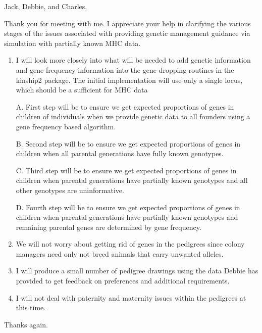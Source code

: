 \documentclass[
]{article}
\begin{document}
Jack, Debbie, and Charles,

Thank you for meeting with me. I appreciate your help in clarifying the
various stages of the issues associated with providing genetic
management guidance via simulation with partially known MHC data.

\begin{enumerate}
\def\labelenumi{\arabic{enumi}.}
\item
  I will look more closely into what will be needed to add genetic
  information and gene frequency information into the gene dropping
  routines in the kinship2 package. The initial implementation will use
  only a single locus, which should be a sufficient for MHC data

  A. First step will be to ensure we get expected proportions of genes
  in children of individuals when we provide genetic data to all
  founders using a gene frequency based algorithm.

  B. Second step will be to ensure we get expected proportions of genes
  in children when all parental generations have fully known genotypes.

  C. Third step will be to ensure we get expected proportions of genes
  in children when parental generations have partially known genotypes
  and all other genotypes are uninformative.

  D. Fourth step will be to ensure we get expected proportions of genes
  in children when parental generations have partially known genotypes
  and remaining parental genes are determined by gene frequency.
\item
  We will not worry about getting rid of genes in the pedigrees since
  colony managers need only not breed animals that carry unwanted
  alleles.
\item
  I will produce a small number of pedigree drawings using the data
  Debbie has provided to get feedback on preferences and additional
  requirements.
\item
  I will not deal with paternity and maternity issues within the
  pedigrees at this time.
\end{enumerate}

Thanks again.
\end{document}
